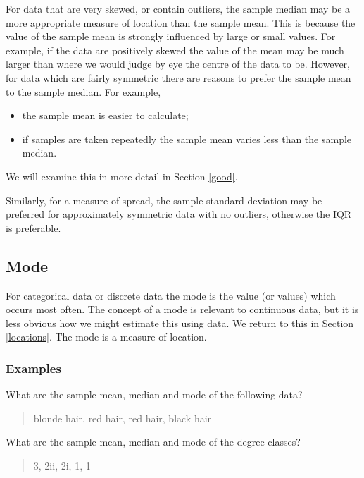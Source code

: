 \documentclass[
  british,
]{book}
\providecommand{\tightlist}{%
  \setlength{\itemsep}{0pt}\setlength{\parskip}{0pt}}
\begin{document}
For data that are very skewed, or contain outliers, the sample median may be a more appropriate measure of location than the sample mean. This is because the value of the sample mean is strongly influenced by large or small values. For example, if the data are positively skewed the value of the mean may be much larger than where we would judge by eye the centre of the data to be. However, for data which are fairly symmetric there are reasons to prefer the sample mean to the sample median. For example,

\begin{itemize}
\tightlist
\item
  the sample mean is easier to calculate;
\item
  if samples are taken repeatedly the sample mean varies less than the sample median.
\end{itemize}

We will examine this in more detail in Section \ref{good}.

Similarly, for a measure of spread, the sample standard deviation may be preferred for approximately symmetric data with no outliers, otherwise the IQR is preferable.

\hypertarget{mode}{%
\subsection{Mode}\label{mode}}

For categorical data or discrete data the mode is the value (or values) which occurs most often. The concept of a mode is relevant to continuous data, but it is less obvious how we might estimate this using data. We return to this in Section \ref{locations}. The mode is a measure of location.

\hypertarget{examples}{%
\subsubsection*{Examples}\label{examples}}

What are the sample mean, median and mode of the following data?

\begin{quote}
blonde hair, red hair, red hair, black hair
\end{quote}

What are the sample mean, median and mode of the degree classes?

\begin{quote}
3, 2ii, 2i, 1, 1
\end{quote}
\end{document}
